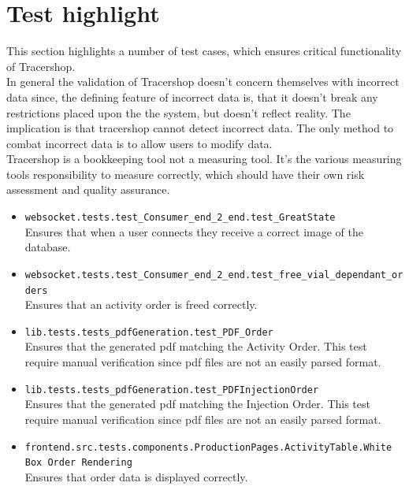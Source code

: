 \documentclass{article}
\begin{document}
\section*{Test highlight}
This section highlights a number of test cases, which ensures critical functionality of Tracershop.\\
In general the validation of Tracershop doesn't concern themselves with \gls{incorrect data} since, the defining feature of incorrect data is,
that it doesn't break any restrictions placed upon the the system, but doesn't reflect reality. The implication is that tracershop cannot detect incorrect data.
The only method to combat \gls{incorrect data} is to allow users to modify data.\\
Tracershop is a bookkeeping tool not a measuring tool. It's the various measuring tools responsibility to measure correctly, which should have their own risk assessment and quality assurance.

\begin{itemize}
  \item \texttt{websocket.tests.test\_Consumer\_end\_2\_end.test\_GreatState}\\
  Ensures that when a user connects they receive a correct image of the database.
  \item \texttt{websocket.tests.test\_Consumer\_end\_2\_end.test\_free\_vial\_dependant\_orders}\\
  Ensures that an activity order is freed correctly.
  \item \texttt{lib.tests.tests\_pdfGeneration.test\_PDF\_Order}\\
  Ensures that the generated pdf matching the Activity Order. This test require manual verification since pdf files are not an easily parsed format.
  \item \texttt{lib.tests.tests\_pdfGeneration.test\_PDFInjectionOrder}\\
  Ensures that the generated pdf matching the Injection Order. This test require manual verification since pdf files are not an easily parsed format.
  \item \texttt{frontend.src.tests.components.ProductionPages.ActivityTable.White Box Order Rendering}\\
  Ensures that order data is displayed correctly.
\end{itemize}
\end{document}
